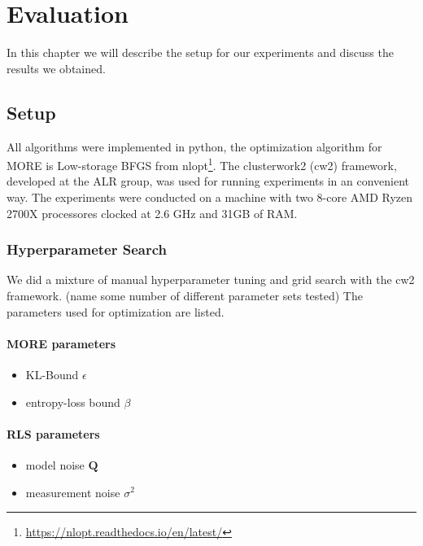 
\chapter{Evaluation}
In this chapter we will describe the setup for our experiments and discuss
the results we obtained.

\section{Setup}
All algorithms were implemented in python,
the optimization algorithm for MORE is Low-storage BFGS
from nlopt\footnote{\href{https://nlopt.readthedocs.io/en/latest/}
  {https://nlopt.readthedocs.io/en/latest/}}.
The clusterwork2 (cw2) framework, developed at the ALR group, was used for
running experiments in an convenient way.
The experiments were conducted on a machine with two 8-core
AMD Ryzen 2700X processores clocked at 2.6 GHz and 31GB of RAM.

\subsection{Hyperparameter Search}




We did a mixture of manual hyperparameter tuning and grid search
with the cw2 framework. (name some number of different parameter
sets tested)
The parameters used for optimization are listed.
\subsubsection{MORE parameters}
\begin{itemize}
\item KL-Bound $\epsilon$
\item entropy-loss bound $\beta$
\end{itemize}
\subsubsection{RLS parameters}
\begin{itemize}
\item model noise $\mathbf{Q}$
\item measurement noise $\sigma^2$
\end{itemize}

